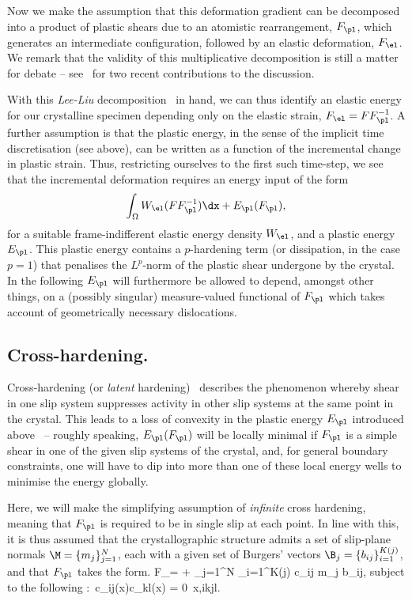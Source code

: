\documentclass[11pt,reqno]{amsart}
\theoremstyle{plain}
\theoremstyle{definition}
\theoremstyle{remark}
\begin{document}
Now we make the assumption that this deformation gradient can be decomposed into a product of plastic shears due to an atomistic rearrangement, $F_\pl$, which generates an intermediate configuration, followed by an elastic deformation, $F_\el$. We remark that the validity of this multiplicative decomposition is still a matter for debate -- see~\cite{Davoli_15,Reina_16} for two recent contributions to the discussion. 

With this  {\em Lee-Liu} decomposition~\cite{Lee_67} in hand, we can thus identify an elastic energy for our crystalline specimen depending only on the elastic strain, $F_\el = FF_{\pl}^{-1}$. A further assumption is that the plastic energy, in the sense of the implicit time discretisation (see above), can be written as a function of the incremental change in plastic strain. Thus, restricting ourselves to the first such time-step, we see that the incremental deformation requires an energy input of the form
$$
\int_\Omega W_\el(FF_\pl^{-1})\dx + E_{\pl}(F_\pl),
$$ 
for a suitable frame-indifferent elastic energy density $W_\el$, and a plastic energy $E_\pl$. This plastic energy contains a $p$-hardening term (or dissipation, in the case $p=1$) that penalises the $L^p$-norm of the plastic shear undergone by the crystal. In the following $E_\pl$ will furthermore be allowed to depend, amongst other things, on a (possibly singular) measure-valued functional of $F_\pl$ which takes account of geometrically necessary dislocations.

\subsection{Cross-hardening.}
Cross-hardening (or {\em latent} hardening)~\cite{WU:1991ij,KOCKS:1964te,FRANCISCO:1980bx} describes  the phenomenon whereby shear in one slip system suppresses activity in other slip systems at the same point in the crystal. This leads to a loss of convexity in the plastic energy $E_\pl$ introduced above~\cite{ortiz} -- roughly speaking, $E_\pl(F_\pl)$ will be locally minimal if $F_\pl$ is a simple shear in one of the given slip systems of the crystal, and, for general boundary constraints, one will have to dip into more than one of these local energy wells to minimise the energy globally. 

Here, we will make the simplifying assumption of {\em infinite} cross hardening, meaning that $F_\pl$ is required to be in single slip at each point. In line with this, it is thus assumed that the crystallographic structure admits a set of slip-plane normals $\M=\{m_j\}_{j=1}^N$, each with a given set of Burgers' vectors $\B_j = \{b_{ij}\}_{i=1}^{K(j)}$, and that $F_\pl$ takes the form.
\be\label{eq:fpl}
F_\pl = \Id + \sum_{j=1}^N \sum_{i=1}^{K(j)} c_{ij} m_j \otimes b_{ij},
\ee 
subject to the following
\be
{}:~c_{ij}(x)c_{kl}(x) = 0\quad{}~x\in\Omega,\quad{}\quad i\neq k\quad{}\quad j\neq l.
\ee
\end{document}
